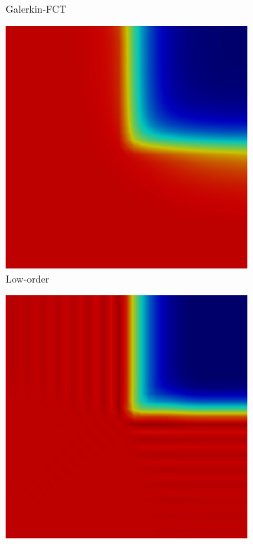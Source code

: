 \documentclass{beamer}
\begin{document}
\begin{frame}
\begin{figure}[h]
\begin{subfigure}{0.3\textwidth}
      \caption{Galerkin-FCT}
   \end{subfigure}
   \begin{subfigure}{0.3\textwidth}
      \includegraphics[width=\textwidth]{./figures/skew_low.png}
      \caption{Low-order}
   \end{subfigure}
   \begin{subfigure}{0.3\textwidth}
      \includegraphics[width=\textwidth]{./figures/skew_EV.png}

\end{subfigure}
\end{figure}
\end{frame}
\end{document}
